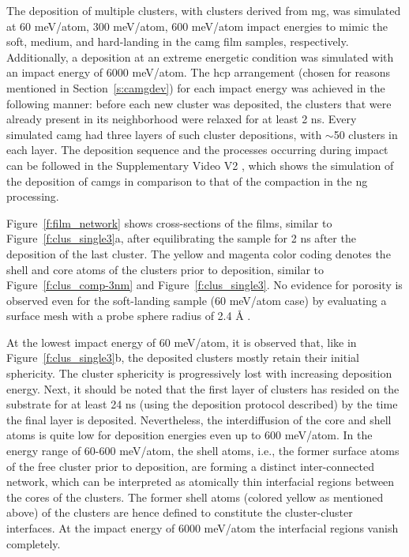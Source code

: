 \begin{changebar}
The deposition of multiple clusters, with clusters derived from  \cz \gls{mg}, was simulated at 60 meV/atom, 300 meV/atom, 600 meV/atom impact energies to mimic the soft, medium, and hard-landing in the \gls{camg} film samples, respectively. Additionally, a deposition at an extreme energetic condition was simulated with an impact energy of 6000 meV/atom. The \gls{hcp} arrangement (chosen for reasons mentioned in Section~\ref{s:camgdev}) for each impact energy was achieved in the following manner: before each new cluster was deposited, the clusters that were already present in its neighborhood were relaxed for at least 2 ns. Every simulated \gls{camg} had three layers of such cluster depositions, with $\sim$50 clusters in each layer. The deposition sequence and the processes occurring during impact can be followed in the Supplementary Video V2 , which shows the simulation of the deposition of \gls{camg}s in comparison to that of the compaction in the \gls{ng} processing. \par

Figure~\ref{f:film_network} shows cross-sections of the films, similar to Figure~\ref{f:clus_single3}a, after equilibrating the sample for 2 ns after the deposition of the last cluster. The yellow and magenta color coding denotes the shell and core atoms of the clusters prior to deposition, similar to Figure~\ref{f:clus_comp-3nm} and Figure~\ref{f:clus_single3}. No evidence for porosity is observed even for the soft-landing sample (60 meV/atom case) by evaluating a surface mesh with a probe sphere radius of 2.4 \r{A} \cite{Stukowski2010a,Stukowski2014}. \par

At the lowest impact energy of 60 meV/atom, it is observed that, like in Figure~\ref{f:clus_single3}b, the deposited clusters mostly retain their initial sphericity. The cluster sphericity is progressively lost with increasing deposition energy. Next, it should be noted that the first layer of clusters has resided on the substrate for at least 24 ns (using the deposition protocol described) by the time the final layer is deposited. Nevertheless, the interdiffusion of the core and shell atoms is quite low for deposition energies even up to 600 meV/atom. In the energy range of 60-600 meV/atom, the shell atoms, i.e., the former surface atoms of the free cluster prior to deposition, are forming a distinct inter-connected network, which can be interpreted as atomically thin interfacial regions between the cores of the clusters. The former shell atoms (colored yellow as mentioned above)
of the clusters are hence defined to constitute the cluster-cluster interfaces. At the impact energy of 6000 meV/atom the interfacial regions vanish completely. \par


\end{changebar}
